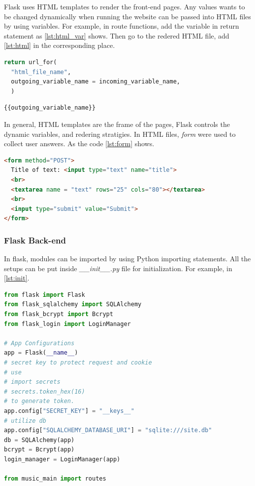Flask uses HTML templates to render the front-end pages. Any values wants to be
changed dynamically when running the website can be passed into HTML files by using
variables. For example, in route functions, add the variable in return statement
as \ref{lst:html_var} shows. Then go to the redered HTML file, add \ref{lst:html}
in the corresponding place.

\begin{lstlisting}[language=Python, label={lst:html_var}, caption=Flask Route Template Variables]
return url_for(
  "html_file_name",
  outgoing_variable_name = incoming_variable_name,
  )
\end{lstlisting}

\begin{lstlisting}[language=HTML, label={lst:html}, caption=HTML Python Variables]
{{outgoing_variable_name}}
\end{lstlisting}

In general, HTML templates are the frame of the pages, Flask controls the dynamic
variables, and redering stratigies. In HTML files, \emph{form} were used to collect
user answers. As the code \ref{lst:form} shows.

\begin{lstlisting}[language=HTML, label={lst:form}, caption=HTML Forms]
<form method="POST">
  Title of text: <input type="text" name="title">
  <br>
  <textarea name = "text" rows="25" cols="80"></textarea>
  <br>
  <input type="submit" value="Submit">
</form>
\end{lstlisting}

\subsubsection{Flask Back-end}

In flask, modules can be imported by using Python importing statements.
All the setups can be put inside \emph{\_\_init\_\_.py} file for initialization. For
example, in \ref{lst:init}.

\begin{lstlisting}[language=Python, label={lst:init}, caption=Python Project Initialization]
from flask import Flask
from flask_sqlalchemy import SQLAlchemy
from flask_bcrypt import Bcrypt
from flask_login import LoginManager

# App Configurations
app = Flask(__name__)
# secret key to protect request and cookie
# use
# import secrets
# secrets.token_hex(16)
# to generate token.
app.config["SECRET_KEY"] = "__keys__"
# utilize db
app.config["SQLALCHEMY_DATABASE_URI"] = "sqlite:///site.db"
db = SQLAlchemy(app)
bcrypt = Bcrypt(app)
login_manager = LoginManager(app)

from music_main import routes
\end{lstlisting}

